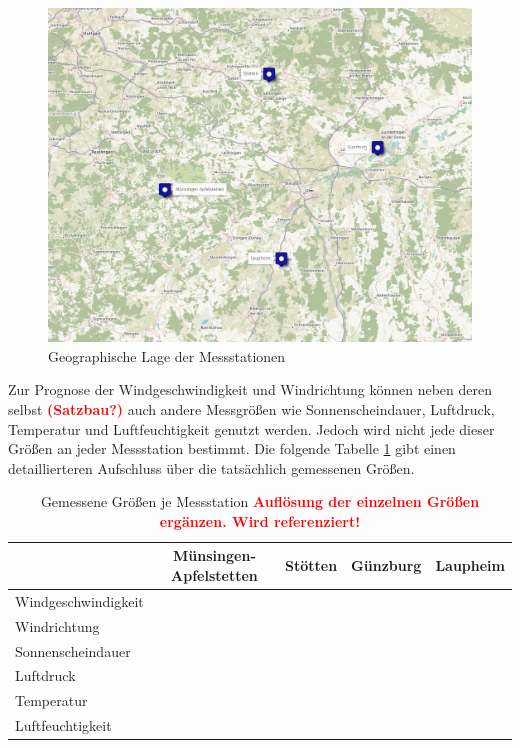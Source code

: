 \documentclass[
12pt, %
toc=listofnumbered, %
toc=chapterentrydotfill, %
numbers=noenddot, %
captions=tableheading, %
bibliography=numbered
]{scrreprt}
\newcommand{\cmark}{\ding{51}}%
\newcommand{\xmark}{\ding{55}}%
\newcommand{\highlight}[1]{\textbf{\textcolor{red}{#1}}}
\begin{document}
\begin{figure}[tph]
	\begin{center}
		\includegraphics[width=\textwidth]{./images/map.png}
		\caption{Geographische Lage der Messstationen \cite{2021_OpenStreetMap-Contributors_UMap}}
		\label{fig:map}
	\end{center}
\end{figure}

Zur Prognose der Windgeschwindigkeit und Windrichtung können neben deren selbst \highlight{(Satzbau?)} auch andere Messgrößen wie Sonnenscheindauer, Luftdruck, Temperatur und Luftfeuchtigkeit genutzt werden. Jedoch wird nicht jede dieser Größen an jeder Messstation bestimmt. Die folgende Tabelle \ref{tab:messgrößen} gibt einen detaillierteren Aufschluss über die tatsächlich gemessenen Größen.

\begin{table}[ht]
	\centering
	\caption{Gemessene Größen je Messstation \highlight{Auflösung der einzelnen Größen ergänzen. Wird referenziert!}}
	\begin{tabular}{|l|c|c|c|c|}
		\hline
        \rowcolor{color80}
		& \textbf{Münsingen-Apfelstetten} & \textbf{Stötten} & \textbf{Günzburg} & \textbf{Laupheim} \\\hline
		Windgeschwindigkeit & \cmark & \cmark & \cmark & \cmark \\\hline
		Windrichtung & \cmark & \cmark & \cmark & \cmark \\\hline
		Sonnenscheindauer & \cmark & \cmark & \xmark & \xmark \\\hline
		Luftdruck & \xmark & \cmark & \xmark & \cmark \\\hline
		Temperatur & \cmark & \cmark & \cmark & \cmark \\\hline
		Luftfeuchtigkeit & \cmark & \cmark & \cmark & \cmark \\\hline
	\end{tabular}
\label{tab:messgrößen}
\end{table}
\end{document}
